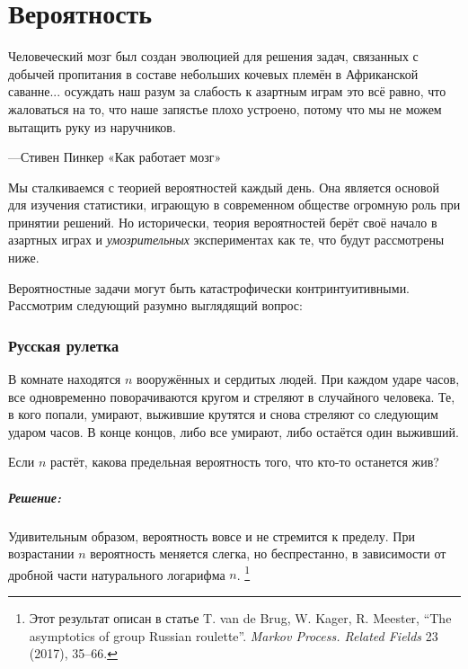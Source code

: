 \chapter*{Вероятность}

\setlength{\epigraphwidth}{.85\textwidth}
\epigraph{Человеческий мозг был создан эволюцией для решения задач, связанных с добычей пропитания в составе небольших кочевых племён в Африканской саванне...
осуждать наш разум за слабость к азартным играм это всё равно, что жаловаться на то, что наше запястье плохо устроено, потому что мы не можем вытащить руку из наручников.}{---Стивен Пинкер «Как работает мозг»%
}

Мы сталкиваемся с теорией вероятностей каждый день.
Она является основой для изучения статистики, играющую в современном обществе огромную роль при принятии решений.
Но исторически, теория вероятностей берёт своё начало в азартных играх и \emph{умозрительных} экспериментах как те, что будут рассмотрены ниже.

\medskip

Вероятностные задачи могут быть катастрофически контринтуитивными.
Рассмотрим следующий разумно выглядящий вопрос:

\subsection*{Русская рулетка} %

В комнате находятся $n$ вооружённых и сердитых людей.
При каждом ударе часов, все одновременно поворачиваются кругом и стреляют в случайного человека.
Те, в кого попали, умирают, выжившие крутятся и снова стреляют со следующим ударом часов.
В конце концов, либо все умирают, либо остаётся один выживший.

Если $n$ растёт, какова предельная вероятность того, что кто-то останется жив?

\paragraph{Решение:} Удивительным образом, вероятность вовсе и не стремится к пределу.
При возрастании $n$ вероятность меняется слегка, но беспрестанно, в зависимости от дробной части натурального логарифма $n$.%
\footnote{Этот результат описан в статье 
T. van de Brug, W. Kager, R. Meester, ``The asymptotics of group Russian roulette''.
\emph{Markov Process. Related Fields} 23 (2017), 35--66.}

